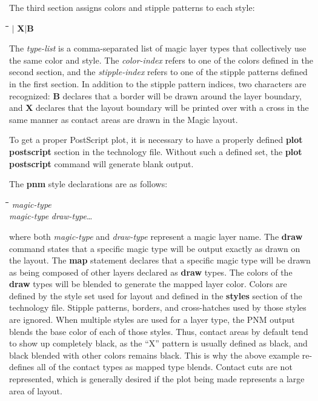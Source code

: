 \documentclass[letterpaper,twoside,12pt]{article}
\def\hinch{\hspace*{0.5in}}
\def\starti{\begin{center}\begin{tabbing}\hinch\=\hinch\=\hinch\=\hinch\=\kill}
\def\endi{\end{tabbing}\end{center}}
\def\ii{\>\>\>}
\def\vbar{$|$}
\begin{document}
The third section assigns colors and stipple patterns to each style:

\starti
   \ii {\itshape type-list color-index stipple-index}\vbar
	{\bfseries X}\vbar {\bfseries B}
\endi

The {\itshape type-list} is a comma-separated list of magic layer types
that collectively use the same color and style.  The {\itshape color-index}
refers to one of the colors defined in the second section, and the
{\itshape stipple-index} refers to one of the stipple patterns defined in
the first section.  In addition to the stipple pattern indices, two characters
are recognized:  {\bfseries B} declares that a border will be drawn around
the layer boundary, and {\bfseries X} declares that the layout boundary will
be printed over with a cross in the same manner as contact areas are drawn
in the Magic layout.

To get a proper PostScript plot, it is necessary to have a properly defined
{\bfseries plot postscript} section in the technology file.  Without such
a defined set, the {\bfseries plot postscript} command will generate blank
output.

The {\bfseries pnm} style declarations are as follows:

\starti
   \ii {\bfseries draw} {\itshape magic-type} \\
   \ii {\bfseries map} {\itshape magic-type} {\itshape draw-type}\dots
\endi

where both {\itshape magic-type} and {\itshape draw-type} represent
a magic layer name.  The {\bfseries draw} command states that a specific
magic type will be output exactly as drawn on the layout.  The {\bfseries
map} statement declares that a specific magic type will be drawn as
being composed of other layers declared as {\bfseries draw} types.
The colors of the {\bfseries draw} types will be blended to generate
the mapped layer color.  Colors are defined by the style set used for
layout and defined in the {\bfseries styles} section of the technology
file.  Stipple patterns, borders, and cross-hatches used by those styles
are ignored.  When multiple styles are used for a layer type, the PNM
output blends the base color of each of those styles.  Thus, contact
areas by default tend to show up completely black, as the ``X'' pattern
is usually defined as black, and black blended with other colors
remains black.  This is why the above example re-defines all of the
contact types as mapped type blends.  Contact cuts are not represented,
which is generally desired if the plot being made represents a large
area of layout.
\end{document}
